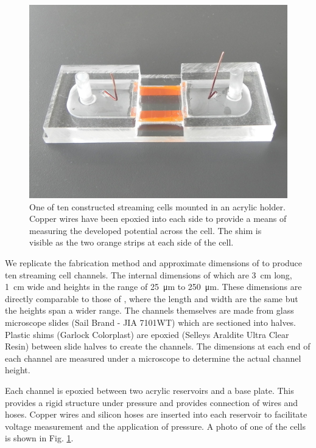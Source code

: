 \documentclass[10pt,final,journal]{IEEEtran}
\begin{document}
    \begin{figure}
        \begin{center}
        \includegraphics[width=\linewidth]{Photo_streamingPotential_Assembly_Step3.JPG}
        \end{center}
        \caption{One of ten constructed streaming cells mounted in an acrylic holder. Copper wires have been epoxied into each side to provide a means of measuring the developed potential across the cell. The shim is visible as the two orange strips at each side of the cell.}
        \label{fig:cell}
    \end{figure}

    We replicate the fabrication method and approximate dimensions of \cite{Gu2000} to produce ten streaming cell channels.
    The internal dimensions of which are \SI{3}{\centi\metre} long, \SI{1}{\centi\metre} wide and heights in the range of \SI{25}{\micro\metre} to \SI{250}{\micro\metre}.
    These dimensions are directly comparable to those of \cite{Gu2000}, where the length and width are the same but the heights span a wider range.
    The channels themselves are made from glass microscope slides (Sail Brand - JIA 7101WT) which are sectioned into halves.
    Plastic shims (Garlock Colorplast) are epoxied (Selleys Araldite Ultra Clear Resin) between slide halves to create the channels.
    The dimensions at each end of each channel are measured under a microscope to determine the actual channel height.

    Each channel is epoxied between two acrylic reservoirs and a base plate.
    This provides a rigid structure under pressure and provides connection of wires and hoses.
    Copper wires and silicon hoses are inserted into each reservoir to facilitate voltage measurement and the application of pressure.
    A photo of one of the cells is shown in Fig. \ref{fig:cell}.
\end{document}

